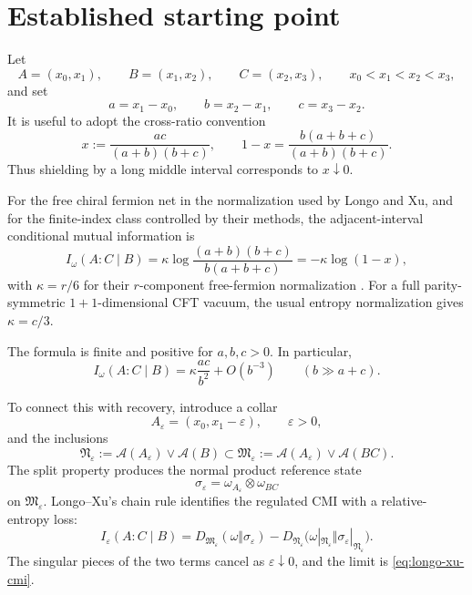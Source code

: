 \documentclass[11pt]{article}
\theoremstyle{accenttheorem}
\theoremstyle{definition}
\newcommand{\cA}{\mathcal{A}}
\newcommand{\cM}{\mathfrak{M}}
\newcommand{\cN}{\mathfrak{N}}
\newcommand{\CMI}{I}
\newcommand{\RE}{D}
\newcommand{\eps}{\varepsilon}
\newcommand{\1}{\mathbf{1}}
\begin{document}
\clearpage
\tableofcontents
\clearpage

\section{Established starting point}

Let
\[
 A=(x_0,x_1),\qquad B=(x_1,x_2),\qquad C=(x_2,x_3),
 \qquad x_0<x_1<x_2<x_3,
\]
and set
\[
 a=x_1-x_0,\qquad b=x_2-x_1,\qquad c=x_3-x_2.
\]
It is useful to adopt the cross-ratio convention
\begin{equation}\label{eq:x-def}
 x:=\frac{ac}{(a+b)(b+c)},
 \qquad
 1-x=\frac{b(a+b+c)}{(a+b)(b+c)}.
\end{equation}
Thus shielding by a long middle interval corresponds to \(x\downarrow0\).

For the free chiral fermion net in the normalization used by Longo and Xu, and for the finite-index class controlled by their methods, the adjacent-interval conditional mutual information is
\begin{equation}\label{eq:longo-xu-cmi}
 \CMI_\omega(A:C\mid B)
 =\kappa\log\frac{(a+b)(b+c)}{b(a+b+c)}
 =-\kappa\log(1-x),
\end{equation}
with \(\kappa=r/6\) for their \(r\)-component free-fermion normalization \cite{LongoXu}.  For a full parity-symmetric \(1+1\)-dimensional CFT vacuum, the usual entropy normalization gives \(\kappa=c/3\).

The formula is finite and positive for \(a,b,c>0\).  In particular,
\begin{equation}\label{eq:large-b-cmi}
 \CMI_\omega(A:C\mid B)
 =\kappa\frac{ac}{b^2}+O(b^{-3})
 \qquad (b\gg a+c).
\end{equation}

To connect this with recovery, introduce a collar
\[
 A_\eps=(x_0,x_1-\eps),\qquad \eps>0,
\]
and the inclusions
\begin{equation}\label{eq:collar-inclusion}
 \cN_\eps
 :=\cA(A_\eps)\vee\cA(B)
 \subset
 \cM_\eps
 :=\cA(A_\eps)\vee\cA(BC).
\end{equation}
The split property produces the normal product reference state
\[
 \sigma_\eps=\omega_{A_\eps}\otimes\omega_{BC}
\]
on \(\cM_\eps\).  Longo--Xu's chain rule identifies the regulated CMI with a relative-entropy loss:
\begin{equation}\label{eq:dpi-defect}
 \CMI_\eps(A:C\mid B)
 =\RE_{\cM_\eps}(\omega\Vert\sigma_\eps)
 -\RE_{\cN_\eps}
 \bigl(\omega|_{\cN_\eps}\Vert\sigma_\eps|_{\cN_\eps}\bigr).
\end{equation}
The singular pieces of the two terms cancel as \(\eps\downarrow0\), and the limit is \eqref{eq:longo-xu-cmi}.
\end{document}
